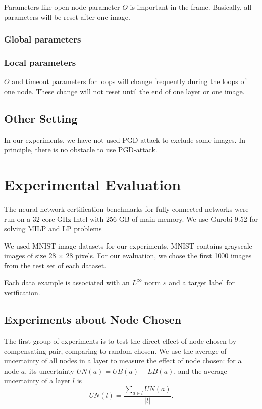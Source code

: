 \documentclass{llncs}
\begin{document}
Parameters like open node parameter $O$ is important in the frame. Basically, all parameters will be reset after one image.

\subsubsection*{Global parameters}




\subsubsection*{Local parameters}

$O$ and timeout parameters for loops will change frequently during the loops of one node. These change will not reset until the end of one layer or one image.



\subsection{Other Setting}

In our experiments, we have not used PGD-attack to exclude some images. In principle, there is no obstacle to use PGD-attack.



\section{Experimental Evaluation}

The neural network certification benchmarks for fully connected networks were run on a 32 core
GHz Intel with 256 GB of main memory. We use Gurobi 9.52 for solving MILP and LP problems


We used MNIST image datasets for our experiments. MNIST contains grayscale images of size 28 × 28 pixels. For our evaluation, we chose the first
1000 images from the test set of each dataset.

Each data example is associated with an $L^\infty$ norm $\varepsilon$ and a target label
for verification.

\subsection{Experiments about Node Chosen}

The first group of experiments is to test the direct effect of node chosen by compensating pair, comparing to random chosen. We use the average of uncertainty of all nodes in a layer to measure the effect of node chosen: for a node $a$, its uncertainty $UN(a) = UB(a)-LB(a)$, and the average uncertainty of a layer $l$ is $$UN(l) = \dfrac{\sum_{a\in l}UN(a)}{|l|}.$$
\end{document}
